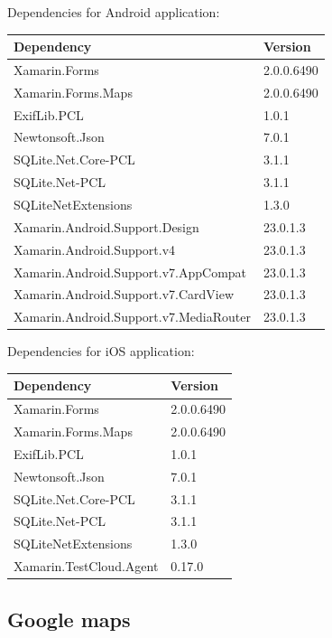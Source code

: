 \documentclass[12pt]{article}
\begin{document}
	Dependencies for Android application:
	\begin{table}[htbp]
		\begin{tabular}{ p{10cm}  p{2cm} }
			\textbf{Dependency} & \textbf{Version} \\ \hline
			Xamarin.Forms & 2.0.0.6490	 \\
			Xamarin.Forms.Maps & 2.0.0.6490	 \\
			ExifLib.PCL & 1.0.1 \\
			Newtonsoft.Json & 7.0.1 \\
			SQLite.Net.Core-PCL & 3.1.1 \\
			SQLite.Net-PCL & 3.1.1 \\
			SQLiteNetExtensions & 1.3.0 \\
			Xamarin.Android.Support.Design & 23.0.1.3\\
			Xamarin.Android.Support.v4 & 23.0.1.3 \\
			Xamarin.Android.Support.v7.AppCompat & 23.0.1.3 \\
			Xamarin.Android.Support.v7.CardView & 23.0.1.3\\
			Xamarin.Android.Support.v7.MediaRouter & 23.0.1.3\\
		\end{tabular}
	\end{table}
	\clearpage
	Dependencies for iOS application:
	\begin{table}[htbp]
		\begin{tabular}{ p{10cm}  p{2cm} }
			\textbf{Dependency} & \textbf{Version} \\ \hline
			Xamarin.Forms & 2.0.0.6490	 \\
			Xamarin.Forms.Maps & 2.0.0.6490	 \\
			ExifLib.PCL & 1.0.1 \\
			Newtonsoft.Json & 7.0.1 \\
			SQLite.Net.Core-PCL & 3.1.1 \\
			SQLite.Net-PCL & 3.1.1 \\
			SQLiteNetExtensions & 1.3.0 \\
			Xamarin.TestCloud.Agent & 0.17.0
		\end{tabular}
	\end{table}
	
	\subsection{Google maps}
	
\end{document}
